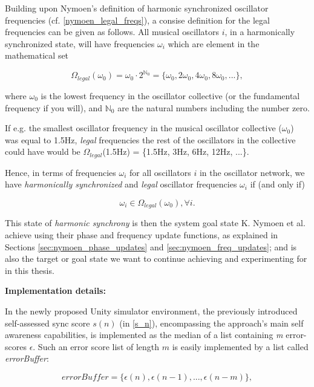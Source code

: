 	Building upon Nymoen's definition of harmonic synchronized oscillator frequencies (cf. \eqref{nymoen_legal_freqs}), a consise definition for the legal frequencies can be given as follows. All musical oscillators $i$, in a harmonically synchronized state, will have frequencies $\omega_i$ which are element in the mathematical set

	\begin{equation}\label{impl_legal_freqs}
	\Omega_{legal}(\omega_0) = \omega_{0} \cdot 2^{\mathbb{N}_0} = \{\omega_{0}, 2\omega_{0}, 4\omega_{0}, 8\omega_{0}, ...\} ,
	\end{equation}

	where $\omega_{0}$ is the lowest frequency in the oscillator collective (or the fundamental frequency if you will), and $\mathbb{N}_0$ are the natural numbers including the number zero. \nl

	If e.g. the smallest oscillator frequency in the musical oscillator collective ($\omega_0$) was equal to 1.5Hz, \textit{legal} frequencies the rest of the oscillators in the collective could have would be $\Omega_{legal}$(1.5Hz) = \{1.5Hz, 3Hz, 6Hz, 12Hz, ...\}.

	Hence, in terms of frequencies $\omega_i$ for all oscillators $i$ in the oscillator network, we have \textit{harmonically synchronized} and \textit{legal} oscillator frequencies $\omega_i$ if (and only if)

	\begin{equation}\label{synced_freqs}
	\omega_i \in \Omega_{legal}(\omega_0) , \forall i.
	\end{equation} \nl

	This state of \textit{harmonic synchrony} is then the system goal state K. Nymoen et al. achieve using their phase and frequency update functions, as explained in Sections \ref{sec:nymoen_phase_updates} and \ref{sec:nymoen_freq_updates}; and is also the target or goal state we want to continue achieving and experimenting for in this thesis.
	
	
	\textbf{Implementation details:} \nl
	
	In the newly proposed Unity simulator environment, the previously introduced self-assessed sync score $s(n)$ (in \ref{s_n}), encompassing the approach's main self awareness capabilities, is implemented as the median of a list containing \textit{m} error-scores $\epsilon$. Such an error score list of length $m$ is easily implemented by a list called \textit{errorBuffer}:
	
	\begin{equation}
	\label{error_buffer}
		errorBuffer = \{\epsilon(n), \epsilon(n-1), ... , \epsilon(n-m)\},
	\end{equation} \nl
	
